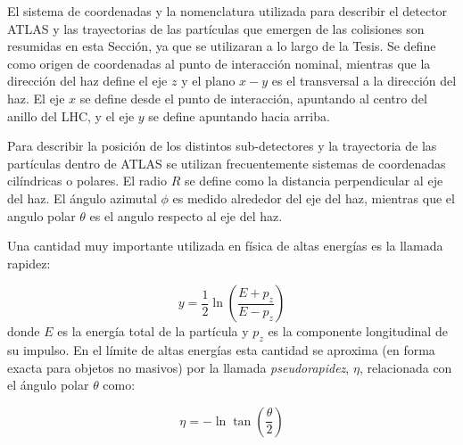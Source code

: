 
El sistema de coordenadas y la nomenclatura utilizada para describir el detector
ATLAS y las trayectorias de las partículas que emergen de las colisiones son
resumidas en esta Sección, ya que se utilizaran a lo largo de la Tesis. Se
define como origen de coordenadas al punto de interacción nominal, mientras que
la dirección del haz define el eje $z$ y el plano $x-y$ es el transversal a la
dirección del haz. El eje $x$ se define desde el punto de interacción, apuntando
al centro del anillo del LHC, y el eje $y$ se define apuntando hacia arriba.

Para describir la posición de los distintos
sub-detectores y la trayectoria de las partículas dentro de ATLAS se utilizan
frecuentemente sistemas de coordenadas cilíndricas o polares. El radio $R$ se
define como la distancia perpendicular al eje del haz. El ángulo azimutal $\phi
$ es medido alrededor del eje del haz, mientras que el angulo polar $\theta$
es el angulo respecto al eje del haz.

Una cantidad muy importante utilizada en física de altas energías es la
llamada rapidez:

\begin{equation}
  y = \frac{1}{2} \ln \left( \frac{E+p_z}{E-p_z} \right)
\end{equation}
%
donde $E$ es la energía total de la partícula y $p_z$ es la componente
longitudinal de su impulso. En el límite de altas energías esta cantidad se
aproxima (en forma exacta para objetos no masivos) por la llamada
\emph{pseudorapidez}, $\eta$, relacionada con el ángulo polar $\theta$ como:

\begin{equation}
  \eta = - \ln \tan \left( \frac{\theta}{2} \right)
\end{equation}

